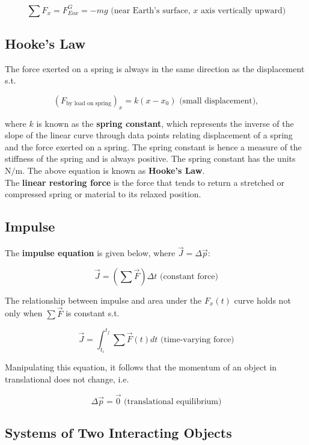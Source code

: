         \[
            \sum F_x = F^G_{Eox} = -mg \text{ (near Earth's surface, $x$ axis vertically upward)}
        \]


    \subsection{Hooke's Law}

        The force exerted on a spring is always in the same direction as the displacement s.t.

        \[
            (F_{\text{by load on spring}})_x = k(x-x_0) \text{ (small displacement)},
        \]

        where $k$ is known as the \textbf{spring constant}, which represents the inverse of the slope of the linear curve through data points relating displacement of a spring and the force exerted on a spring. The
        spring constant is hence a measure of the stiffness of the spring and is always positive. The spring constant has the units $\text{N}/\text{m}$. The above equation is known as \textbf{Hooke's Law}. \\

        The \textbf{linear restoring force} is the force that tends to return a stretched or compressed spring or material to its relaxed position.


    \subsection{Impulse}

        The \textbf{impulse equation} is given below, where $\vec{J} = \Delta \vec{p}$:

        \[
            \vec{J} = \left(\sum\vec{F}\right) \Delta t \text{ (constant force)}
        \]

        The relationship between impulse and area under the $F_x (t)$ curve holds not only when $\sum\vec{F}$ is constant s.t.

        \[
            \vec{J} = \int^{t_f}_{t_i}\sum\vec{F}(t) dt \text{ (time-varying force)}
        \]

        Manipulating this equation, it follows that the momentum of an object in translational does not change, i.e.

        \[
            \Delta \vec{p} = \vec{0} \text{ (translational equilibrium)}
        \]


    \subsection{Systems of Two Interacting Objects}


